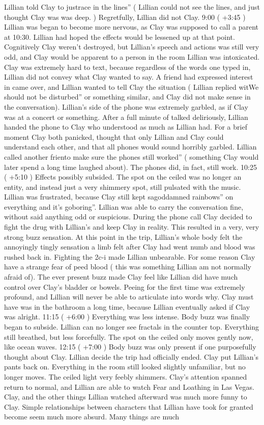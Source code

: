 \documentclass[12pt]{book}
\begin{document}
Lillian told Clay to justrace in the lines'' ( Lillian could not see the lines, and just thought Clay was was deep. ) Regretfully, Lillian did not Clay. 9:00 ( +3:45 ) Lillian was began to become more nervous, as Clay was supposed to call a parent at 10:30. Lillian had hoped the effects would be lessened up at that point. Cognitively Clay weren't destroyed, but Lillian's speech and actions was still very odd, and Clay would be apparent to a person in the room Lillian was intoxicated. Clay was extremely hard to text, because regardless of the words one typed in, Lillian did not convey what Clay wanted to say. A friend had expressed interest in came over, and Lillian wanted to tell Clay the situation ( Lillian replied witWe should not be disturbed'' or something similar, and Clay did not make sense in the conversation). Lillian's side of the phone was extremely garbled, as if Clay was at a concert or something. After a full minute of talked deliriously, Lillian handed the phone to Clay who understood as much as Lillian had. For a brief moment Clay both panicked, thought that only Lillian and Clay could understand each other, and that all phones would sound horribly garbled. Lillian called another friento make sure the phones still worked'' ( something Clay would later spend a long time laughed about). The phones did, in fact, still work. 10:25 ( +5:10 ) Effects possibly subsided. The spot on the ceiled was no longer an entity, and instead just a very shimmery spot, still pulsated with the music. Lillian was frustrated, because Clay still kept sagoddamned rainbows'' on everything and it's goboring''. Lillian was able to carry the conversation fine, without said anything odd or suspicious. During the phone call Clay decided to fight the drug with Lillian's and keep Clay in reality. This resulted in a very, very strong buzz sensation. At this point in the trip, Lillian's whole body felt the annoyingly tingly sensation a limb felt after Clay had went numb and blood was rushed back in. Fighting the 2c-i made Lillian unbearable. For some reason Clay have a strange fear of peed blood ( this was something Lillian am not normally afraid of). The ever present buzz made Clay feel like Lillian did have much control over Clay's bladder or bowels. Peeing for the first time was extremely profound, and Lillian will never be able to articulate into words why. Clay must have was in the bathroom a long time, because Lillian eventually asked if Clay was alright. 11:15 ( +6:00 ) Everything was less intense. Body buzz was finally began to subside. Lillian can no longer see fractals in the counter top. Everything still breathed, but less forcefully. The spot on the ceiled only moves gently now, like ocean waves. 12:15 ( +7:00 ) Body buzz was only present if one purposefully thought about Clay. Lillian decide the trip had officially ended. Clay put Lillian's pants back on. Everything in the room still looked slightly unfamiliar, but no longer moves. The ceiled light very feebly shimmers. Clay's attention spanned return to normal, and Lillian are able to watch Fear and Loathing in Las Vegas. Clay, and the other things Lillian watched afterward was much more funny to Clay. Simple relationships between characters that Lillian have took for granted become seem much more absurd. Many things are much 
\end{document}
